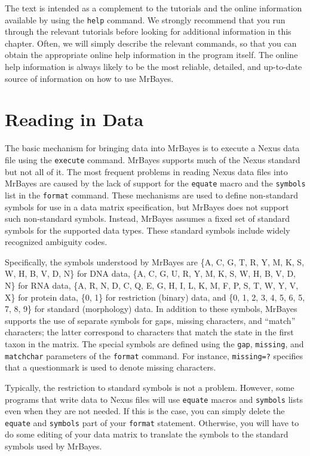 \documentclass[12pt]{book}
\begin{document}
The text is intended as a complement to the tutorials and the online information available by using
the \texttt{help} command. We strongly recommend that you run through the relevant tutorials before
looking for additional information in this chapter. Often, we will simply describe the relevant
commands, so that you can obtain the appropriate online help information in the program itself. The
online help information is always likely to be the most reliable, detailed, and up-to-date source
of information on how to use MrBayes.

\section{Reading in Data}

The basic mechanism for bringing data into MrBayes is to execute a Nexus data file using the
\texttt{execute} command. MrBayes supports much of the Nexus standard \citep{Maddison97} but not
all of it. The most frequent problems in reading Nexus data files into MrBayes are caused by the
lack of support for the \texttt{equate} macro and the \texttt{symbols} list in the \texttt{format}
command. These mechanisms are used to define non-standard symbols for use in a data matrix
specification, but MrBayes does not support such non-standard symbols. Instead, MrBayes assumes a
fixed set of standard symbols for the supported data types. These standard symbols include widely
recognized ambiguity codes.

Specifically, the symbols understood by MrBayes are  \{A, C, G, T, R, Y, M, K, S, W, H, B, V, D,
N\} for DNA data, \{A, C, G, U, R, Y, M, K, S, W, H, B, V, D, N\} for RNA data, \{A, R, N, D, C, Q,
E, G, H, I, L, K, M, F, P, S, T, W, Y, V, X\} for protein data, \{0, 1\} for restriction (binary)
data, and \{0, 1, 2, 3, 4, 5, 6, 5, 7, 8, 9\} for standard (morphology) data. In addition to these
symbols, MrBayes supports the use of separate symbols for gaps, missing characters, and ``match''
characters; the latter correspond to characters that match the state in the first taxon in the
matrix. The special symbols are defined using the \texttt{gap}, \texttt{missing}, and
\texttt{matchchar} parameters of the \texttt{format} command. For instance, \texttt{missing=?}
specifies that a questionmark is used to denote missing characters.

Typically, the restriction to standard symbols is not a problem. However, some programs that write
data to Nexus files will use \texttt{equate} macros and \texttt{symbols} lists even when they are
not needed. If this is the case, you can simply delete the \texttt{equate} and \texttt{symbols}
part of your \texttt{format} statement. Otherwise, you will have to do some editing of your data
matrix to translate the symbols to the standard symbols used by MrBayes.
\end{document}
